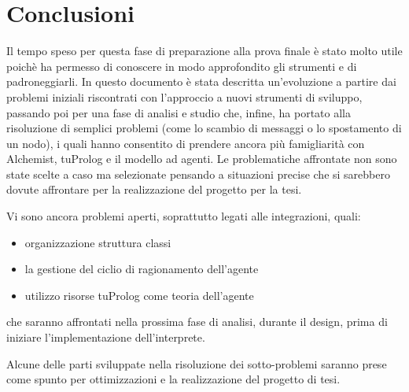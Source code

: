 \chapter*{Conclusioni}
\lhead[\fancyplain{}{\bfseries\thepage}]{\fancyplain{}{\bfseries\rightmark}}

Il tempo speso per questa fase di preparazione alla prova finale è stato molto utile poichè ha permesso di conoscere in modo approfondito gli strumenti e di padroneggiarli. In questo documento è stata descritta un'evoluzione a partire dai problemi iniziali riscontrati con l'approccio a nuovi strumenti di sviluppo, passando poi per una fase di analisi e studio che, infine, ha portato alla risoluzione di semplici problemi (come lo scambio di messaggi o lo spostamento di un nodo), i quali hanno consentito di prendere ancora più famigliarità con Alchemist, tuProlog e il modello ad agenti.
Le problematiche affrontate non sono state scelte a caso ma selezionate pensando a situazioni precise che si sarebbero dovute affrontare per la realizzazione del progetto per la tesi.

Vi sono ancora problemi aperti, soprattutto legati alle integrazioni, quali:
\begin{itemize}
\item organizzazione struttura classi
\item la gestione del ciclio di ragionamento dell'agente
\item utilizzo risorse tuProlog come teoria dell'agente
\end{itemize}
che saranno affrontati nella prossima fase di analisi, durante il design, prima di iniziare l'implementazione dell'interprete.

Alcune delle parti sviluppate nella risoluzione dei sotto-problemi saranno prese come spunto per ottimizzazioni e la realizzazione del progetto di tesi.